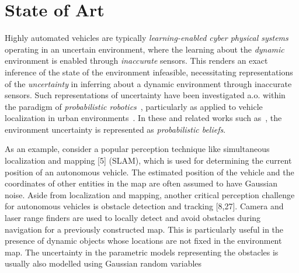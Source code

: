 \section{State of Art}\label{sec:relatedwork}
Highly automated vehicles are typically \emph{learning-enabled cyber physical systems} operating in an uncertain environment, where the learning about the \emph{dynamic} environment is enabled through \emph{inaccurate} sensors. This renders an exact inference of the state of the environment infeasible, necessitating representations of the \emph{uncertainty} in inferring about a dynamic environment through inaccurate sensors. Such representations of uncertainty have been investigated a.o. within the paradigm of \emph{probabilistic robotics}~\cite{probrob}, particularly as applied to vehicle localization in urban environments~\cite{Thrun2007,Thrun2009,Thrun2010}. In these and related works such as~\cite{Perrolaz2014, moras2014}, the environment uncertainty is represented as \emph{probabilistic
beliefs}. 


As an example, consider a popular perception technique like simultaneous localization and
mapping [5] (SLAM), which is used for determining the current position of an autonomous
vehicle. The estimated position of the vehicle and the coordinates of other entities in the map
are often assumed to have Gaussian noise. Aside from localization and mapping, another critical
perception challenge for autonomous vehicles is obstacle detection and tracking [8,27].
Camera and laser range finders are used to locally detect and avoid obstacles during navigation
for a previously constructed map. This is particularly useful in the presence of dynamic
objects whose locations are not fixed in the environment map. The uncertainty in the parametric
models representing the obstacles is usually also modelled using Gaussian random
variables




